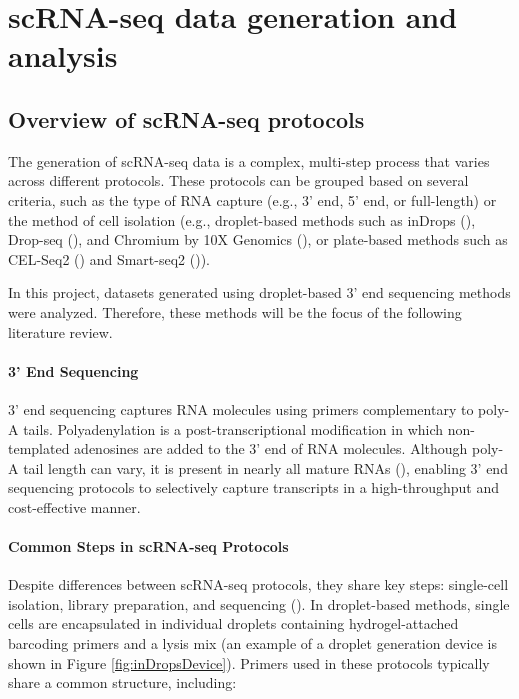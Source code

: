 \section{scRNA-seq data generation and analysis}

\subsection{Overview of scRNA-seq protocols}

The generation of scRNA-seq data is a complex, multi-step process that varies across different protocols.
These protocols can be grouped based on several criteria, such as the type of RNA capture
(e.g., 3' end, 5' end, or full-length) or the method of cell isolation
(e.g., droplet-based methods such as inDrops (\cite{Klein2015}), Drop-seq (\cite{Macosko2015}),
and Chromium by 10X Genomics (\cite{Zheng2017}),
or plate-based methods such as CEL-Seq2 (\cite{Hashimshony2016}) and Smart-seq2 (\cite{Picelli2013})).

In this project, datasets generated using droplet-based 3' end sequencing methods were analyzed.
Therefore, these methods will be the focus of the following literature review.

\paragraph{3' End Sequencing}

3' end sequencing captures RNA molecules using primers complementary to poly-A tails.
Polyadenylation is a post-transcriptional modification in which non-templated adenosines are added to the 3' end of RNA molecules.
Although poly-A tail length can vary, it is present in nearly all mature RNAs (\cite{Brouze2022}),
enabling 3' end sequencing protocols to selectively capture transcripts in a high-throughput and cost-effective manner.

\paragraph{Common Steps in scRNA-seq Protocols}

Despite differences between scRNA-seq protocols, they share key steps:
single-cell isolation, library preparation, and sequencing (\cite{Andrews2018}).
In droplet-based methods, single cells are encapsulated in individual droplets containing hydrogel-attached barcoding primers
and a lysis mix (an example of a droplet generation device is shown in Figure \ref{fig:inDropsDevice}).
Primers used in these protocols typically share a common structure, including:

